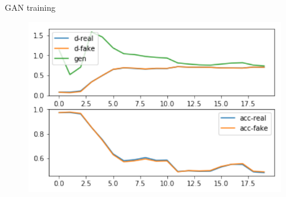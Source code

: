 \documentclass[15pt]{beamer} %
\begin{document}
\begin{frame}{GAN training}
  \begin{figure}
   \centering
   \includegraphics[width=.75\textwidth]{gan_training}
  \end{figure}
\end{frame}
\end{document}
